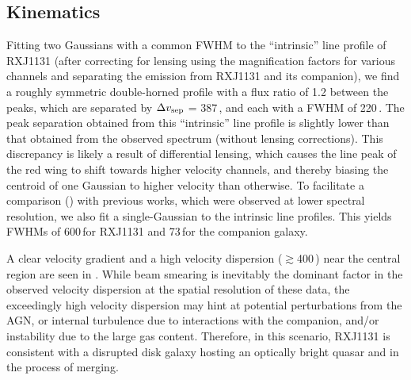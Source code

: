 \documentclass[]{emulateapj}
\begin{document}
\subsection{\bco Kinematics}
Fitting two Gaussians with a common FWHM
to the ``intrinsic'' \bco line profile of RXJ1131 (after correcting for lensing using
the magnification factors for various channels and separating the emission from RXJ1131 and its companion),
we find a roughly symmetric double-horned profile with a flux ratio of 1.2 between the peaks, which
are separated by
$\Delta v_{\rm sep}$ = 387\,\kms, and each with a
FWHM of 220\,\kms.
The peak separation obtained from this ``intrinsic'' line profile is
slightly lower than that obtained from the observed spectrum (\ie without lensing corrections).
This discrepancy is likely a result of differential lensing, which causes the line peak of the red wing
to shift towards higher velocity channels, and thereby biasing the centroid of
one Gaussian to higher velocity than otherwise.
To facilitate a comparison () with previous works, which were observed at lower spectral resolution,
we also fit a single-Gaussian to the intrinsic line profiles.
This yields FWHMs of 600\,\kms for RXJ1131
and 73\,\kms for the companion galaxy.

A clear velocity gradient and a high
velocity dispersion ($\gtrsim$400\,\kms) near the central region
are seen in . While beam smearing is inevitably the
dominant factor in the observed velocity dispersion
at the spatial resolution of these data, the exceedingly
high velocity dispersion may hint
at potential perturbations from the AGN, or internal turbulence due to
interactions with the companion, and/or instability due to the large gas
content.
Therefore, in this scenario, RXJ1131 is
consistent with a disrupted disk galaxy hosting an optically
bright quasar and in the process of merging.
\end{document}
